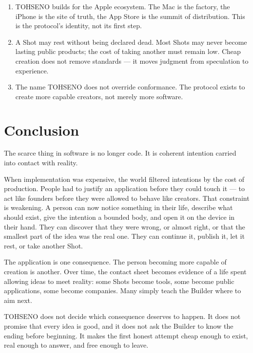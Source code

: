 \documentclass[11pt]{article}
\newcommand{\TOH}{TOHSENO}
\begin{document}
\begin{enumerate}
      Shot; it may not become its owner. A future economic object may be
      linked to a Shot; it is not the Shot.
\item \TOH{} builds for the Apple ecosystem. The Mac is the factory,
      the iPhone is the site of truth, the App Store is the summit of
      distribution. This is the protocol's identity, not its first
      step.
\item A Shot may rest without being declared dead. Most Shots may never
      become lasting public products; the cost of taking another must
      remain low. Cheap creation does not remove standards --- it moves
      judgment from speculation to experience.
\item The name \TOH{} does not override conformance. The protocol
      exists to create more capable creators, not merely more software.
\end{enumerate}

\section{Conclusion}

The scarce thing in software is no longer code. It is coherent intention
carried into contact with reality.

When implementation was expensive, the world filtered intentions by the
cost of production. People had to justify an application before they
could touch it --- to act like founders before they were allowed to
behave like creators. That constraint is weakening. A person can now
notice something in their life, describe what should exist, give the
intention a bounded body, and open it on the device in their hand. They
can discover that they were wrong, or almost right, or that the smallest
part of the idea was the real one. They can continue it, publish it, let
it rest, or take another Shot.

The application is one consequence. The person becoming more capable of
creation is another. Over time, the contact sheet becomes evidence of a
life spent allowing ideas to meet reality: some Shots become tools, some
become public applications, some become companies. Many simply teach the
Builder where to aim next.

\TOH{} does not decide which consequence deserves to happen. It does not
promise that every idea is good, and it does not ask the Builder to know
the ending before beginning. It makes the first honest attempt cheap
enough to exist, real enough to answer, and free enough to leave.
\end{document}
